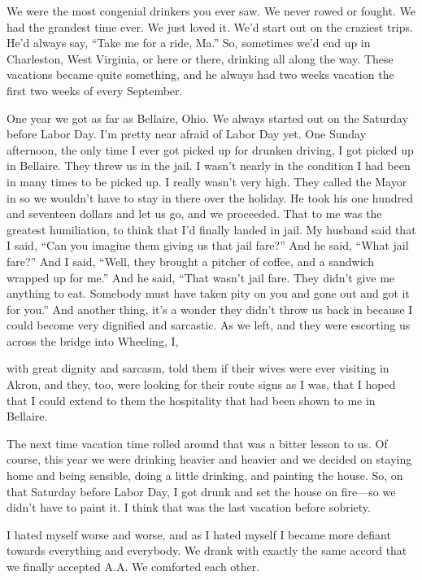 We were the most congenial drinkers you ever saw. We never rowed or fought. We had the grandest time ever. We just loved it. We’d start out on the craziest trips. He’d always say, “Take me for a ride, Ma.” So, sometimes we’d end up in Charleston, West Virginia, or here or there, drinking all along the way. These vacations became quite something, and he always had two weeks vacation the first two weeks of every September.

One year we got as far as Bellaire, Ohio. We always started out on the Saturday before Labor Day. I’m pretty near afraid of Labor Day yet. One Sunday afternoon, the only time I ever got picked up for drunken driving, I got picked up in Bellaire. They threw us in the jail. I wasn’t nearly in the condition I had been in many times to be picked up. I really wasn’t very high. They called the Mayor in so we wouldn’t have to stay in there over the holiday. He took his one hundred and seventeen dollars and let us go, and we proceeded. That to me was the greatest humiliation, to think that I’d finally landed in jail. My husband said that I said, “Can you imagine them giving us that jail fare?” And he said, “What jail fare?” And I said, “Well, they brought a pitcher of coffee, and a sandwich wrapped up for me.” And he said, “That wasn’t jail fare. They didn’t give me anything to eat. Somebody must have taken pity on you and gone out and got it for you.” And another thing, it’s a wonder they didn’t throw us back in because I could become very dignified and sarcastic. As we left, and they were escorting us across the bridge into Wheeling, I,

with great dignity and sarcasm, told them if their wives were ever visiting in Akron, and they, too, were looking for their route signs as I was, that I hoped that I could extend to them the hospitality that had been shown to me in Bellaire.

The next time vacation time rolled around that was a bitter lesson to us. Of course, this year we were drinking heavier and heavier and we decided on staying home and being sensible, doing a little drinking, and painting the house. So, on that Saturday before Labor Day, I got drunk and set the house on fire—so we didn’t have to paint it. I think that was the last vacation before sobriety.

I hated myself worse and worse, and as I hated myself I became more defiant towards everything and everybody. We drank with exactly the same accord that we finally accepted A.A. We comforted each other.

